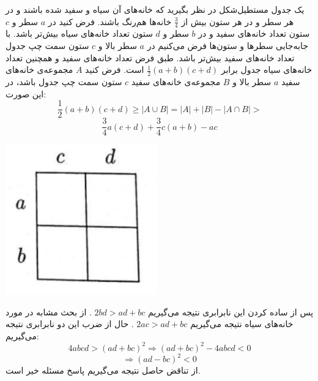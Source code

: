         \p
یک جدول مستطیل‌شکل در نظر بگیرید که خانه‌های آن سیاه و سفید شده باشند و در هر سطر و در هر ستون بیش از
$\frac{3}{4}$
خانه‌ها هم‌رنگ باشند. فرض کنید در
$a$
سطر و
$c$
ستون تعداد خانه‌های سفید و در 
$b$
سطر و
$d$
ستون تعداد خانه‌های سیاه بیش‌تر باشد. با جابه‌جایی سطرها و ستون‌ها فرض می‌کنیم در
$a$
سطر بالا و
$c$
ستون سمت چپ جدول تعداد خانه‌های سفید بیش‌تر باشد. طبق فرض تعداد خانه‌های سفید و همچنین تعداد خانه‌های سیاه جدول برابر
$\frac{1}{2}(a + b)(c + d)$ 
است. فرض کنید
$A$
مجموعه‌ی خانه‌های سفید
$a$
سطر بالا و
$B$
مجموعه‌ی خانه‌های سفید
$c$
ستون سمت چپ جدول باشد، در این صورت:
$$\frac{1}{2}(a + b)(c + d) \geq |A \cup B| = |A| + |B| - |A \cap B| >$$
$$\frac{3}{4}a(c + d) + \frac{3}{4}c(a + b) - ac$$
\begin{center}
\includegraphics[height=6.5cm]{1.png}
\end{center}
پس از ساده کردن این نابرابری نتیجه می‌گیریم
$2bd > ad + bc$
. از بحث مشابه در مورد خانه‌های سیاه نتیجه می‌گیریم
$2ac > ad + bc$
. حال از ضرب این دو نابرابری نتیجه می‌گیریم:
$$4abcd > (ad + bc)^2 \Rightarrow (ad + bc)^2 - 4abcd < 0$$
$$\Rightarrow (ad - bc)^2 < 0$$
از تناقض حاصل نتیجه می‌گیریم پاسخ مسئله خیر است.       